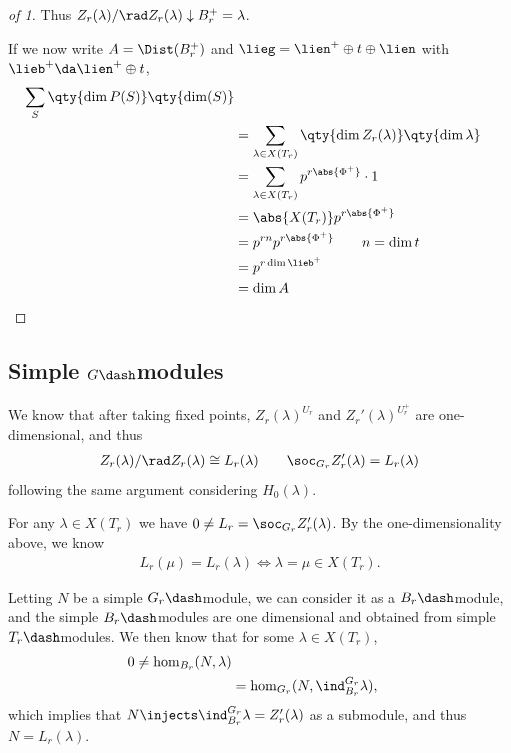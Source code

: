 \begin{proof}[of 1]
Thus \(Z_r(\lambda) / \rad Z_r(\lambda) \downarrow{B_r^+} = \lambda\).

If we now write \(A= \Dist(B_r^+)\) and
\(\lieg = \lien^+ \oplus t \oplus \lien\) with
\(\lieb^+ \da \lien^+ \oplus t\),
\begin{align*}
\sum_S \qty{\dim P(S)} \qty{\dim(S)} \\
&= \sum_{\lambda \in X(T_r)} \qty{\dim Z_r(\lambda)} \qty{\dim \lambda} \\
&= \sum_{\lambda \in X(T_r)} p^{r\abs{\Phi^+}} \cdot 1 \\
&= \abs{X(T_r)} p^{r\abs{\Phi^+}} \\
&= p^{rn} p^{r\abs{\Phi^+}} \qquad n = \dim t\\
&= p^{r \dim \lieb^+} \\
&= \dim A
\end{align*}

\end{proof}

\hypertarget{simple-gdashmodules}{%
\subsection{\texorpdfstring{Simple
\(G\dash\)modules}{Simple G\textbackslash dashmodules}}\label{simple-gdashmodules}}

We know that after taking fixed points, \(Z_r(\lambda)^{U_r}\) and
\(Z_r'(\lambda)^{U_r^+}\) are one-dimensional, and thus
\begin{align*}  
Z_r(\lambda) / \rad Z_r(\lambda) \cong L_r(\lambda) \qquad \soc_{G_r} Z_r'(\lambda) = L_r(\lambda)
\end{align*} following the same argument considering \(H_0(\lambda)\).

For any \(\lambda \in X(T_r)\) we have
\(0\neq L_r = \soc_{G_r} Z_r'(\lambda)\). By the one-dimensionality
above, we know
\begin{align*}  
L_r(\mu) = L_r(\lambda) \iff \lambda = \mu \in X(T_r)
.\end{align*}

Letting \(N\) be a simple \(G_r\dash\)module, we can consider it as a
\(B_r\dash\)module, and the simple \(B_r\dash\)modules are one
dimensional and obtained from simple \(T_r\dash\)modules. We then know
that for some \(\lambda \in X(T_r)\),
\begin{align*}  
0 \neq \hom_{B_r}(N, \lambda) \\
&= \hom_{G_r}(N, \ind_{B_r}^{G_r} \lambda)
,\end{align*} which implies that
\(N\injects \ind_{B_r}^{G_r} \lambda = Z_r'(\lambda)\) as a submodule,
and thus \(N = L_r(\lambda)\).

